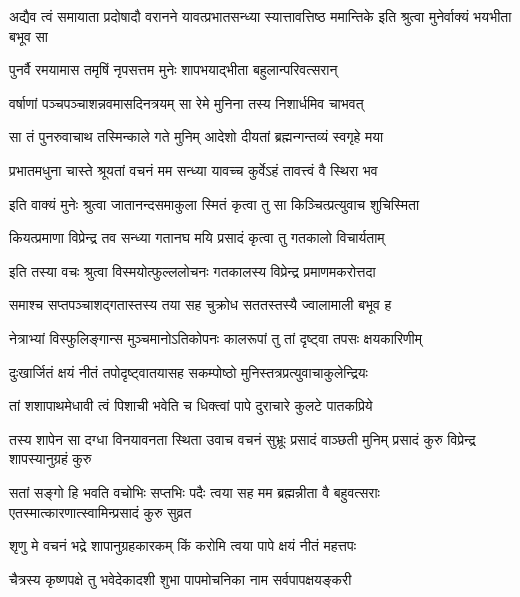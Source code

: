 
\threelineshloka
{अद्यैव त्वं समायाता प्रदोषादौ वरानने}
{यावत्प्रभातसन्ध्या स्यात्तावत्तिष्ठ ममान्तिके}
{इति श्रुत्वा मुनेर्वाक्यं भयभीता बभूव सा}%

\twolineshloka
{पुनर्वै रमयामास तमृषिं नृपसत्तम}
{मुनेः शापभयाद्भीता बहुलान्परिवत्सरान्}%

\twolineshloka
{वर्षाणां पञ्चपञ्चाशन्नवमासदिनत्रयम्}
{सा रेमे मुनिना तस्य निशार्धमिव चाभवत्}%

\twolineshloka
{सा तं पुनरुवाचाथ तस्मिन्काले गते मुनिम्}
{आदेशो दीयतां ब्रह्मन्गन्तव्यं स्वगृहे मया}%


\twolineshloka
{प्रभातमधुना चास्ते श्रूयतां वचनं मम}
{सन्ध्या यावच्च कुर्वेऽहं तावत्त्वं वै स्थिरा भव}%

\twolineshloka
{इति वाक्यं मुनेः श्रुत्वा जातानन्दसमाकुला}
{स्मितं कृत्वा तु सा किञ्चित्प्रत्युवाच शुचिस्मिता}%


\twolineshloka
{कियत्प्रमाणा विप्रेन्द्र तव सन्ध्या गतानघ}
{मयि प्रसादं कृत्वा तु गतकालो विचार्यताम्}%

\twolineshloka
{इति तस्या वचः श्रुत्वा विस्मयोत्फुल्ललोचनः}
{गतकालस्य विप्रेन्द्र प्रमाणमकरोत्तदा}%

\twolineshloka
{समाश्च सप्तपञ्चाशद्गतास्तस्य तया सह}
{चुक्रोध सततस्तस्यै ज्वालामाली बभूव ह}%

\twolineshloka
{नेत्राभ्यां विस्फुलिङ्गान्स मुञ्चमानोऽतिकोपनः}
{कालरूपां तु तां दृष्ट्वा तपसः क्षयकारिणीम्}%

\twolineshloka
{दुःखार्जितं क्षयं नीतं तपोदृष्ट्वातयासह}
{सकम्पोष्ठो मुनिस्तत्रप्रत्युवाचाकुलेन्द्रियः}%

\twolineshloka
{तां शशापाथमेधावी त्वं पिशाची भवेति च}
{धिक्त्वां पापे दुराचारे कुलटे पातकप्रिये}%

\threelineshloka
{तस्य शापेन सा दग्धा विनयावनता स्थिता}
{उवाच वचनं सुभ्रूः प्रसादं वाञ्छती मुनिम्}
{प्रसादं कुरु विप्रेन्द्र शापस्यानुग्रहं कुरु}%

\threelineshloka
{सतां सङ्गो हि भवति वचोभिः सप्तभिः पदैः}
{त्वया सह मम ब्रह्मन्नीता वै बहुवत्सराः}
{एतस्मात्कारणात्स्वामिन्प्रसादं कुरु सुव्रत}%


\twolineshloka
{शृणु मे वचनं भद्रे शापानुग्रहकारकम्}
{किं करोमि त्वया पापे क्षयं नीतं महत्तपः}%

\twolineshloka
{चैत्रस्य कृष्णपक्षे तु भवेदेकादशी शुभा}
{पापमोचनिका नाम सर्वपापक्षयङ्करी}%

